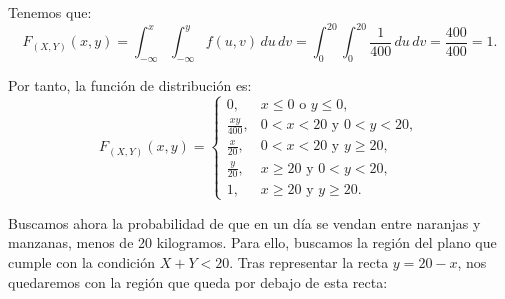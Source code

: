 \begin{ejercicio}
\begin{itemize}
        Tenemos que:
        \begin{equation*}
            F_{(X,Y)}(x, y) = \int_{-\infty}^x \int_{-\infty}^y f(u, v) \, du \, dv =
            \int_{0}^{20} \int_{0}^{20} \frac{1}{400} \, du \, dv = \frac{400}{400} = 1.
        \end{equation*}
    \end{itemize}

    Por tanto, la función de distribución es:
    \begin{equation*}
        F_{(X,Y)}(x, y) = \begin{cases}
            0, & x\leq 0 \text{ o } y\leq 0, \\
            \frac{xy}{400}, & 0 < x < 20 \text{ y } 0 < y < 20, \\
            \frac{x}{20}, & 0 < x < 20 \text{ y } y\geq 20, \\
            \frac{y}{20}, & x\geq 20 \text{ y } 0 < y < 20, \\
            1, & x\geq 20 \text{ y } y\geq 20.
        \end{cases}
    \end{equation*}

    Buscamos ahora la probabilidad de que en un día se vendan entre naranjas y manzanas, menos de 20 kilogramos. Para ello, buscamos la región del plano que cumple con la condición $X+Y < 20$. Tras representar la recta $y=20-x$,
    nos quedaremos con la región que queda por debajo de esta recta:
    \begin{figure}[H]
        \centering
\end{figure}
\end{ejercicio}
